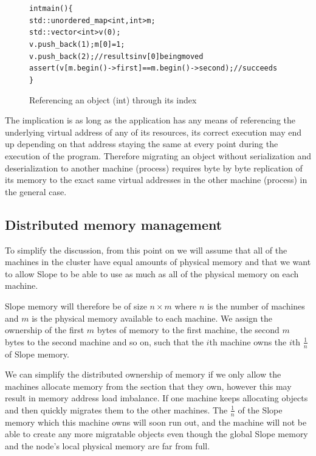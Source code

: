 \begin{figure}[tp]
\begin{alltt}

int main() \{
  std::unordered_map<int, int> m;
  std::vector<int> v(0);
  v.push_back(1); m[0] = 1;
  v.push_back(2); // results in v[0] being moved
  assert(v[m.begin()->first] == m.begin()->second); // succeeds
\}

\end{alltt}
\caption{
    Referencing an object (int) through its index
}
\label{fig:refbyindex}
\end{figure}

The implication is as long as the
application has any means of referencing the underlying virtual address of any
of its resources, its correct execution may end up depending on that address
staying the same at every point during the execution of the program. Therefore
migrating an object without serialization and deserialization to another
machine (process)
requires byte by byte replication of its memory to the exact same virtual
addresses in the other machine (process) in the general case.

\subsection{Distributed memory management}
\label{sec:globalmem}
To simplify the discussion, from this point on we will assume that all of the
machines in the cluster have equal amounts of physical memory and that we want
to allow Slope to be able to use as much as all of the physical memory on each
machine.

Slope memory will therefore be of size $n \times m$ where $n$ is the number
of machines and $m$ is the physical memory available to each machine. We assign
the ownership of the first $m$ bytes of memory to the first machine, the
second $m$ bytes to the second machine and so on, such that the $i$th machine
owns the $i$th $\frac{1}{n}$ of Slope memory.

We can simplify the distributed ownership of memory if we only allow the
machines allocate memory from the section that they own, however this may
result in memory address load imbalance. If one machine keeps
allocating objects and then quickly migrates them to the other machines. The
$\frac{1}{n}$ of the Slope memory which this machine owns will soon run out,
and the machine will not be able to create any more migratable objects
even though the global Slope memory and the node's local physical memory are
far from full.

